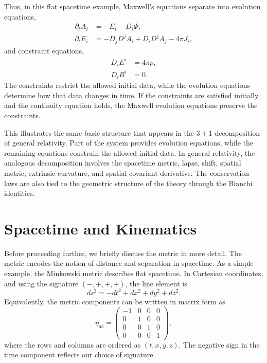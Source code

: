 Thus, in this flat spacetime example, Maxwell's equations separate into evolution equations,
\begin{align}
\partial_t A_i &= -E_i - D_i\Phi , \\
\partial_t E_i
&=
-D_jD^j A_i
+ D_iD^j A_j
- 4\pi J_i ,
\end{align}
and constraint equations,
\begin{align}
D_i E^i &= 4\pi \rho , \\
D_i B^i &= 0 .
\end{align}
The constraints restrict the allowed initial data, while the evolution equations determine how that data changes in time. If the constraints are satisfied initially and the continuity equation holds, the Maxwell evolution equations preserve the constraints.

This illustrates the same basic structure that appears in the $3+1$ decomposition of general relativity. Part of the system provides evolution equations, while the remaining equations constrain the allowed initial data. In general relativity, the analogous decomposition involves the spacetime metric, lapse, shift, spatial metric, extrinsic curvature, and spatial covariant derivative. The conservation laws are also tied to the geometric structure of the theory through the Bianchi identities.

\section{Spacetime and Kinematics}
Before proceeding further, we briefly discuss the metric in more detail. The metric encodes the notion of distance and separation in spacetime. As a simple example, the Minkowski metric describes flat spacetime. In Cartesian coordinates, and using the signature $(-,+,+,+)$, the line element is
\begin{equation}
ds^2 = -dt^2 + dx^2 + dy^2 + dz^2 .
\end{equation}
Equivalently, the metric components can be written in matrix form as
\begin{equation}
\eta_{ab} =
\begin{pmatrix}
-1 & 0 & 0 & 0 \\
0 & 1 & 0 & 0 \\
0 & 0 & 1 & 0 \\
0 & 0 & 0 & 1
\end{pmatrix},
\end{equation}
where the rows and columns are ordered as $(t,x,y,z)$. The negative sign in the time component reflects our choice of signature.

